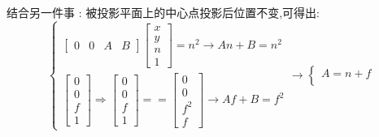 {{{\begin{itemize}
{\begin{itemize}
{                      结合另一件事 : 被投影平面上的中心点投影后位置不变,可得出:$$
                        \begin{cases}
                          \begin{bmatrix}
                            0 & 0 & A & B
                          \end{bmatrix}
                          \begin{bmatrix}
                            x \\
                            y \\
                            n \\
                            1
                          \end{bmatrix}
                          =
                          n^2
                          \rightarrow
                          An + B = n^2 \\
                          \begin{bmatrix}
                            0 \\
                            0 \\
                            f \\
                            1
                          \end{bmatrix}
                          \Rightarrow
                          \begin{bmatrix}
                            0 \\
                            0 \\
                            f \\
                            1
                          \end{bmatrix}
                          ==
                          \begin{bmatrix}
                            0   \\
                            0   \\
                            f^2 \\
                            f
                          \end{bmatrix}
                          \rightarrow
                          Af + B = f^2
                        \end{cases}
                        \rightarrow
                        \begin{cases}
                          A = n + f \\

\end{cases}$$}
\end{itemize}}
\end{itemize}}}}
